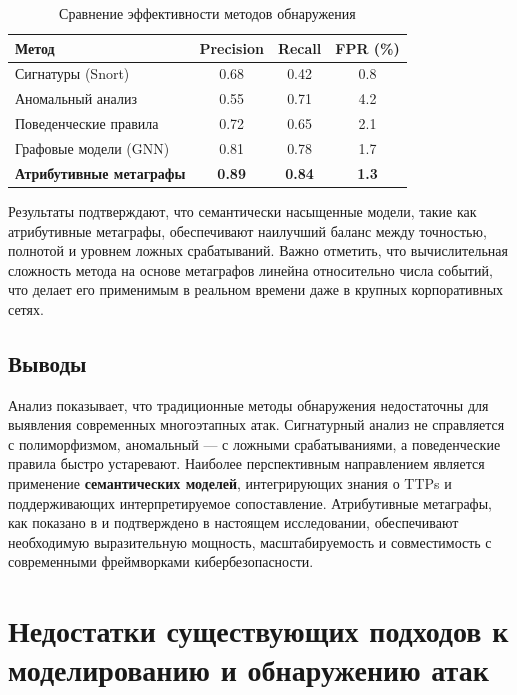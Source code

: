 \documentclass{article}
\begin{document}
\begin{table}[h]
    \centering
    \caption{Сравнение эффективности методов обнаружения}
    \label{tab:performance_comparison}
    \begin{tabular}{lccc}
        \toprule
        Метод                           & Precision     & Recall        & FPR (\%)     \\
        \midrule
        Сигнатуры (Snort)               & 0.68          & 0.42          & 0.8          \\
        Аномальный анализ               & 0.55          & 0.71          & 4.2          \\
        Поведенческие правила           & 0.72          & 0.65          & 2.1          \\
        Графовые модели (GNN)           & 0.81          & 0.78          & 1.7          \\
        \textbf{Атрибутивные метаграфы} & \textbf{0.89} & \textbf{0.84} & \textbf{1.3} \\
        \bottomrule
    \end{tabular}
\end{table}

Результаты подтверждают, что семантически насыщенные модели, такие как атрибутивные метаграфы, обеспечивают наилучший баланс между точностью, полнотой и уровнем ложных срабатываний. Важно отметить, что вычислительная сложность метода на основе метаграфов линейна относительно числа событий, что делает его применимым в реальном времени даже в крупных корпоративных сетях.

\subsection{Выводы}

Анализ показывает, что традиционные методы обнаружения недостаточны для выявления современных многоэтапных атак. Сигнатурный анализ не справляется с полиморфизмом, аномальный — с ложными срабатываниями, а поведенческие правила быстро устаревают. Наиболее перспективным направлением является применение \textbf{семантических моделей}, интегрирующих знания о TTPs и поддерживающих интерпретируемое сопоставление. Атрибутивные метаграфы, как показано в \cite{Latypov2020} и подтверждено в настоящем исследовании, обеспечивают необходимую выразительную мощность, масштабируемость и совместимость с современными фреймворками кибербезопасности.

\section{Недостатки существующих подходов к моделированию и обнаружению атак}\label{sec:ch1/sec3}
\end{document}

